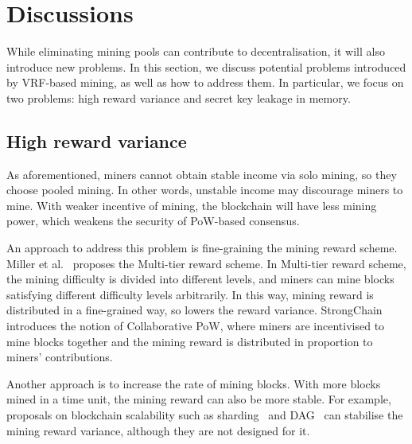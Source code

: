 \section{Discussions}
\label{sec:discussions}

While eliminating mining pools can contribute to decentralisation, it will also introduce new problems.
In this section, we discuss potential problems introduced by VRF-based mining, as well as how to address them.
In particular, we focus on two problems: high reward variance and secret key leakage in memory.

\subsection{High reward variance}

As aforementioned, miners cannot obtain stable income via solo mining, so they choose pooled mining.
In other words, unstable income may discourage miners to mine.
With weaker incentive of mining, the blockchain will have less mining power, which weakens the security of PoW-based consensus.

An approach to address this problem is fine-graining the mining reward scheme.
Miller et al.~\cite{miller2015nonoutsourceable} proposes the Multi-tier reward scheme.
In Multi-tier reward scheme, the mining difficulty is divided into different levels, and miners can mine blocks satisfying different difficulty levels arbitrarily.
In this way, mining reward is distributed in a fine-grained way, so lowers the reward variance.
StrongChain~\cite{szalachowski2019strongchain} introduces the notion of Collaborative PoW, where miners are incentivised to mine blocks together and the mining reward is distributed in proportion to miners' contributions.

Another approach is to increase the rate of mining blocks.
With more blocks mined in a time unit, the mining reward can also be more stable.
For example, proposals on blockchain scalability such as sharding~\cite{wang2019monoxide} and DAG~\cite{li2018scaling} can stabilise the mining reward variance, although they are not designed for it.







